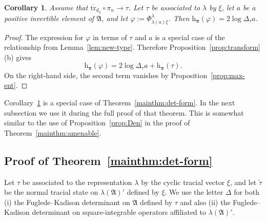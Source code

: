 \documentclass[12pt,a4paper]{article}
\numberwithin{equation}{section}
\newtheorem{cor}[thm]{Corollary}
\theoremstyle{remark}
\newcommand{\rmh}{\mathrm{h}}
\newcommand{\A}{\mathfrak{A}}
\renewcommand{\phi}{\varphi}
\renewcommand{\l}{\lambda}
\renewcommand{\t}[1]{\widetilde{#1}}
\newcommand{\bspi}{\boldsymbol{\pi}}
\newcommand{\tr}{\overline{\mathrm{tr}}}
\begin{document}
\begin{cor}\label{cor:pre-B}
	Assume that $\tr_{d_n}\circ \pi_n \to \tau$.  Let $\tau$ be associated to $\l$ by $\xi$, let $a$ be a positive invertible element of $\A$, and let $\phi := \Phi^\l_{\l(a)\xi}$.  Then $\rmh_{\bspi}(\phi) = 2\log\Delta_\tau a$.
\end{cor}

\begin{proof}
The expression for $\phi$ in terms of $\tau$ and $a$ is a special case of the relationship from Lemma~\ref{lem:new-type}.  Therefore Proposition~\ref{prop:transform}(b) gives
\[\rmh_{\bspi}(\phi) = 2 \log \Delta_\tau a + \rmh_{\bspi}(\tau).\]
On the right-hand side, the second term vanishes by Proposition~\ref{prop:max-ent}.
\end{proof}

Corollary~\ref{cor:pre-B} is a special case of Theorem~\ref{mainthm:det-form}.  In the next subsection we use it during the full proof of that theorem.  This is somewhat similar to the use of Proposition~\ref{prop:Den} in the proof of Theorem~\ref{mainthm:amenable}.










\subsection{Proof of Theorem~\ref{mainthm:det-form}}\label{subs:det-form}

Let $\tau$ be associated to the representation $\l$ by the cyclic tracial vector $\xi$, and let $\t{\tau}$ be the normal tracial state on $\l(\A)'$ defined by $\xi$.  We use the letter $\Delta$ for both (i) the Fuglede--Kadison determinant on $\A$ defined by $\tau$ and also (ii) the Fuglede--Kadison determinant on square-integrable operators affiliated to $\l(\A)'$.
\end{document}
